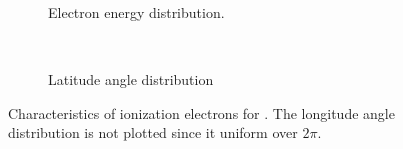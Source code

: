 \begin{figure}[!ht]
	\begin{subfigure}{0.5\textwidth}
		
		\caption{Electron energy distribution.}
		\label{}
	\end{subfigure}
	~
	\begin{subfigure}{0.5\textwidth}
		
		\caption{Latitude angle distribution}
		\label{}
	\end{subfigure}
	\caption[]{Characteristics of ionization electrons for . The longitude angle distribution is not plotted since it uniform over $2 \pi$.}
	\label{chap3:garfieldangle}
\end{figure}
